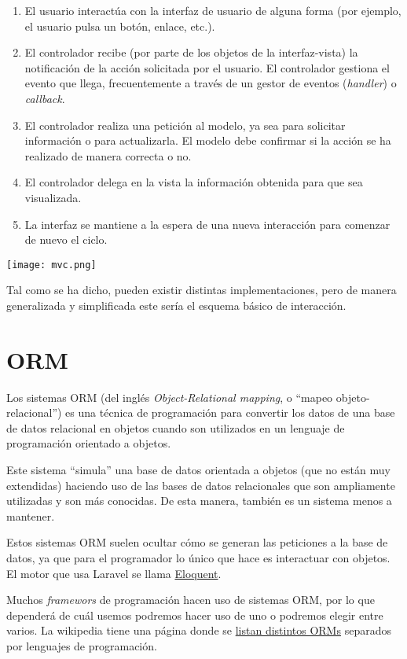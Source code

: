 {
\begin{minipage}{0.56\linewidth}
\begin{enumerate}
    \item El usuario interactúa con la interfaz de usuario de alguna forma (por ejemplo, el usuario pulsa un botón, enlace, etc.).

    \item El controlador recibe (por parte de los objetos de la interfaz-vista) la notificación de la acción solicitada por el usuario. El controlador gestiona el evento que llega, frecuentemente a través de un gestor de eventos (\textit{handler}) o \textit{callback}.

    \item El controlador realiza una petición al modelo, ya sea para solicitar información o para actualizarla. El modelo debe confirmar si la acción se ha realizado de manera correcta o no.

    \item El controlador delega en la vista la información obtenida para que sea visualizada.

    \item La interfaz se mantiene a la espera de una nueva interacción para comenzar de nuevo el ciclo.
\end{enumerate}
\end{minipage}
\hfill
\begin{minipage}{0.4\linewidth}
    \texttt{[image: mvc.png]}
\end{minipage}
}

\vspace{10pt}
Tal como se ha dicho, pueden existir distintas implementaciones, pero de manera generalizada y simplificada este sería el esquema básico de interacción.


\chapter{ORM}
Los sistemas ORM (del inglés \textit{Object-Relational mapping}, o “mapeo objeto-relacional”) es una técnica de programación para convertir los datos de una base de datos relacional en objetos cuando son utilizados en un lenguaje de programación orientado a objetos.

Este sistema “simula” una base de datos orientada a objetos (que no están muy extendidas) haciendo uso de las bases de datos relacionales que son ampliamente utilizadas y son más conocidas. De esta manera, también es un sistema menos a mantener.

Estos sistemas ORM suelen ocultar cómo se generan las peticiones a la base de datos, ya que para el programador lo único que hace es interactuar con objetos. El motor que usa Laravel se llama \href{https://laravel.com/docs/10.x/eloquent#retrieving-models}{Eloquent}.

Muchos \textit{framewors} de programación hacen uso de sistemas ORM, por lo que dependerá de cuál usemos podremos hacer uso de uno o podremos elegir entre varios. La wikipedia tiene una página donde se \href{https://en.wikipedia.org/wiki/List_of_object%E2%80%93relational_mapping_software}{listan distintos ORMs} separados por lenguajes de programación.